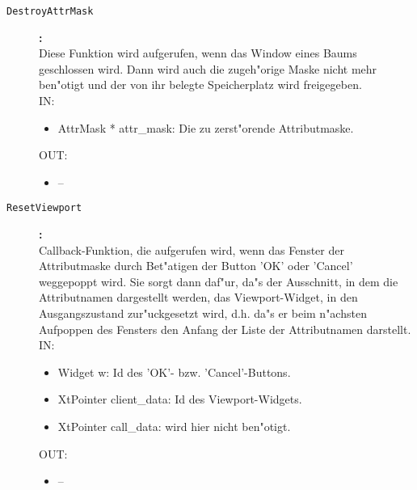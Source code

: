 \begin{description}
\item[\tt DestroyAttrMask]{\bf :\\}
Diese Funktion wird aufgerufen, wenn das Window eines Baums geschlossen wird. Dann wird auch die zugeh"orige Maske nicht mehr ben"otigt und der von ihr belegte Speicherplatz wird freigegeben. \\
IN:
\begin{itemize}
   \item AttrMask * attr\_mask: Die zu zerst"orende Attributmaske.
\end{itemize}
OUT:
\begin{itemize}
   \item --
\end{itemize}

\item[\tt ResetViewport]{\bf :\\}
Callback-Funktion, die aufgerufen wird, wenn das Fenster der Attributmaske durch Bet"atigen der Button 'OK' oder 'Cancel' weggepoppt wird. Sie sorgt dann daf"ur, da"s der Ausschnitt, in dem die Attributnamen dargestellt werden, das Viewport-Widget, in den Ausgangszustand zur"uckgesetzt wird, d.h. da"s er beim n"achsten Aufpoppen des Fensters den Anfang der Liste der Attributnamen darstellt. \\
IN:
\begin{itemize}
   \item Widget w:      Id des 'OK'- bzw. 'Cancel'-Buttons. \item XtPointer client\_data: Id des Viewport-Widgets. \item XtPointer call\_data:   wird hier nicht ben"otigt.
\end{itemize}
OUT:
\begin{itemize}
   \item --
\end{itemize}


\end{description}
